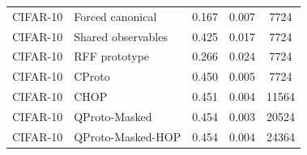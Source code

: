 \begin{table}[t]
\begin{tabular}{llccc}
CIFAR-10 & Forced canonical & 0.167 & 0.007 & 7724 \\
CIFAR-10 & Shared observables & 0.425 & 0.017 & 7724 \\
CIFAR-10 & RFF prototype & 0.266 & 0.024 & 7724 \\
CIFAR-10 & CProto & 0.450 & 0.005 & 7724 \\
CIFAR-10 & CHOP & 0.451 & 0.004 & 11564 \\
CIFAR-10 & QProto-Masked & 0.454 & 0.003 & 20524 \\
CIFAR-10 & QProto-Masked-HOP & 0.454 & 0.004 & 24364 \\
\bottomrule
\end{tabular}
\end{table}
